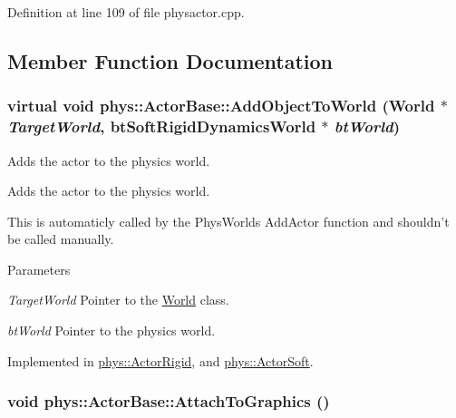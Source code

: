 Definition at line 109 of file physactor.cpp.



\subsection{Member Function Documentation}
\hypertarget{classphys_1_1ActorBase_ac5d4ad5a634b16000742f506ed5957fb}{
\subsubsection[{AddObjectToWorld}]{\setlength{\rightskip}{0pt plus 5cm}virtual void phys::ActorBase::AddObjectToWorld ({\bf World} $\ast$ {\em TargetWorld}, \/  btSoftRigidDynamicsWorld $\ast$ {\em btWorld})}}
\label{d8/d0f/classphys_1_1ActorBase_ac5d4ad5a634b16000742f506ed5957fb}


Adds the actor to the physics world. 

Adds the actor to the physics world. \par
 This is automaticly called by the PhysWorlds AddActor function and shouldn't be called manually. 
\begin{DoxyParams}{Parameters}
\item[{\em TargetWorld}]Pointer to the \hyperlink{classphys_1_1World}{World} class. \item[{\em btWorld}]Pointer to the physics world. \end{DoxyParams}


Implemented in \hyperlink{classphys_1_1ActorRigid_a3c56eb06fe6a7d468b7a67c45ade7be4}{phys::ActorRigid}, and \hyperlink{classphys_1_1ActorSoft_a3a704ab32f847a5d0e060f8a592efefd}{phys::ActorSoft}.

\hypertarget{classphys_1_1ActorBase_a45f190cb9b647bb3385d1298f9dab589}{
\subsubsection[{AttachToGraphics}]{\setlength{\rightskip}{0pt plus 5cm}void phys::ActorBase::AttachToGraphics ()}}
\label{d8/d0f/classphys_1_1ActorBase_a45f190cb9b647bb3385d1298f9dab589}


